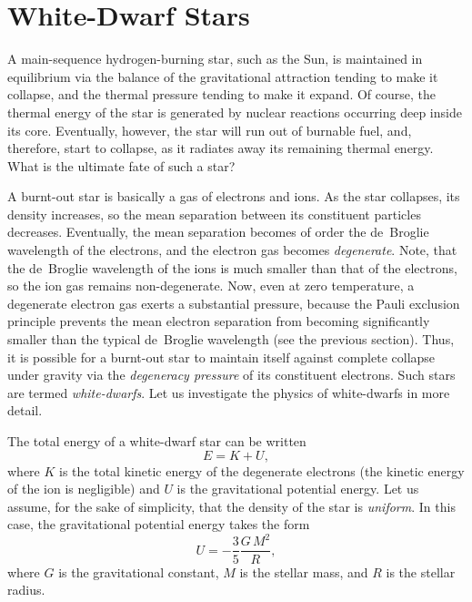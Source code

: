 \section{White-Dwarf Stars}
A main-sequence hydrogen-burning star, such as the Sun, is maintained
in equilibrium via the balance of the gravitational attraction tending
to  make it collapse, and the thermal pressure tending to make it expand. 
Of course, the
thermal energy of the star is generated by nuclear reactions occurring deep inside
its core. Eventually, however, the star will run out of burnable fuel, and, therefore,
start to collapse, as it radiates away its remaining thermal energy.
What is the ultimate fate of such a star?

A burnt-out star is basically a gas of electrons and ions. As the
star collapses, its density increases, so the mean separation between its
constituent particles decreases. Eventually, the mean separation becomes
of order the de~Broglie wavelength of the electrons, and the electron
gas becomes {\em degenerate}. Note, that the de~Broglie wavelength of the
ions is  much smaller than that of the electrons, so the ion gas remains
non-degenerate. Now, even at
zero temperature, a degenerate electron gas exerts a substantial pressure,
because the Pauli exclusion principle prevents the mean electron separation
from becoming significantly  smaller than the typical 
de~Broglie wavelength (see the
previous section). Thus, it is possible for a burnt-out star to maintain
itself against complete collapse under gravity via the {\em degeneracy pressure}
of its constituent electrons. Such stars are termed {\em white-dwarfs}. 
Let us investigate the physics of white-dwarfs in more detail.

The total energy of a white-dwarf star can be written
\begin{equation}
E = K + U,\label{e8wd1}
\end{equation}
where $K$ is the total kinetic energy of the degenerate electrons (the kinetic
energy of the ion is negligible) and $U$ is the gravitational potential
energy. Let us assume, for the sake of simplicity, that the density of the
star is {\em uniform}. In this case, the gravitational potential
energy takes the form
\begin{equation}
U = -\frac{3}{5}\frac{G\,M^2}{R},\label{e8wd2}
\end{equation}
where $G$ is the gravitational constant, $M$ is the stellar mass, and $R$ is
the stellar radius.


